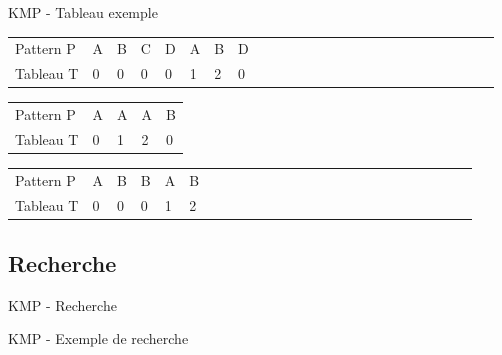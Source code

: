 \documentclass[12pt]{beamer}
\begin{document}
\begin{frame}{KMP - Tableau exemple}
\begin{center}
\begin{tabular}{ l || p{0.01cm}p{0.01cm}p{0.01cm}p{0.01cm}p{0.01cm}p{0.01cm}p{0.01cm}p{0.01cm}p{0.01cm}p{0.01cm}p{0.01cm}p{0.01cm}p{0.01cm}p{0.01cm}p{0.01cm}p{0.01cm}p{0.01cm}p{0.01cm}p{0.01cm}p{0.01cm}p{0.01cm}p{0.01cm}p{0.01cm}p{0.01cm}} 
   Pattern P &A&B&C&D&A&B&D  \\
   Tableau T &0&0&0&0&1&2&0
\end{tabular}
\end{center}


\begin{center}
\begin{tabular}{ l || p{0.01cm}p{0.01cm}p{0.01cm}p{0.01cm}} 
   Pattern P &A&A&A&B  \\
   Tableau T &0&1&2&0
\end{tabular}
\end{center}


\begin{center}
\begin{tabular}{ l || p{0.01cm}p{0.01cm}p{0.01cm}p{0.01cm}p{0.01cm}p{0.01cm}p{0.01cm}p{0.01cm}p{0.01cm}p{0.01cm}p{0.01cm}p{0.01cm}p{0.01cm}p{0.01cm}p{0.01cm}p{0.01cm}p{0.01cm}p{0.01cm}p{0.01cm}p{0.01cm}p{0.01cm}p{0.01cm}p{0.01cm}p{0.01cm}} 
   Pattern P &A&B&B&A&B  \\
   Tableau T &0&0&0&1&2
\end{tabular}
\end{center}

\end{frame}

\subsection{Recherche}
\begin{frame}{KMP - Recherche}

\end{frame}
\begin{frame}{KMP - Exemple de recherche}

\end{frame}
\end{document}
